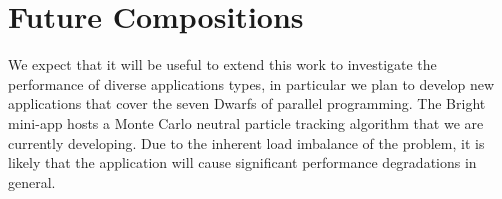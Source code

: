 \documentclass[runningheads,a4paper]{llncs}
\begin{document}

%
%
%

\section{Future Compositions}

We expect that it will be useful to extend this work to investigate the performance of diverse applications types, in particular we plan to develop new applications that cover the seven Dwarfs of parallel programming. The Bright mini-app hosts a Monte Carlo neutral particle tracking algorithm that we are currently developing. Due to the inherent load imbalance of the problem, it is likely that the application will cause significant performance degradations in general.
\end{document}

